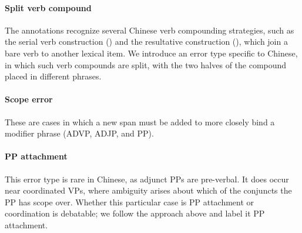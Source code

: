 \paragraph{Split verb compound} The \pctb annotations recognize several
Chinese verb compounding strategies, such as the serial verb construction
(\mbox{}) and the resultative construction
(\mbox{}), which join a bare verb to another
lexical item.  We introduce an error type specific to Chinese, in which such
verb compounds are split, with the two halves of the compound placed in
different phrases.

\paragraph{Scope error}
These are cases in which a new span must be added to
more closely bind a modifier phrase (ADVP, ADJP, and PP).

\paragraph{PP attachment} 
This error type is rare in Chinese, as adjunct PPs are pre-verbal.  It does
occur near coordinated VPs, where ambiguity arises about which of the conjuncts
the PP has scope over.  Whether this particular case is PP attachment or
coordination is debatable; we follow the approach above and
label it PP attachment.

